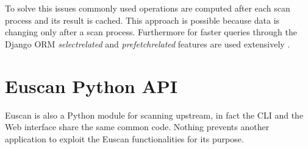 To solve this issues commonly used operations are computed after each scan process and its result is cached. This approach is possible because data is changing only after a scan process. Furthermore for faster queries through the Django ORM \emph{select\textunderscore related} and \emph{prefetch\textunderscore related} features are used extensively \cite{django_orm}.

\section{Euscan Python API}
Euscan is also a Python module for scanning upstream, in fact the CLI and the Web interface share the same common code. Nothing prevents another application to exploit the Euscan functionalities for its purpose.
